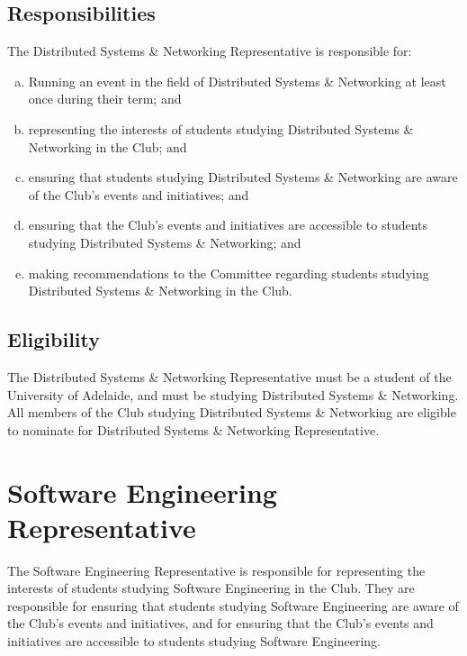 \documentclass[11pt]{report}
\begin{document}
\subsection{Responsibilities}
The Distributed Systems \& Networking Representative is responsible for:
\begin{enumerate}[(a)]
    \item Running an event in the field of Distributed Systems \& Networking at least once during their term; and
    \item representing the interests of students studying Distributed Systems \& Networking in the Club; and
    \item ensuring that students studying Distributed Systems \& Networking are aware of the Club's events and initiatives; and
    \item ensuring that the Club's events and initiatives are accessible to students studying Distributed Systems \& Networking; and
    \item making recommendations to the Committee regarding students studying Distributed Systems \& Networking in the Club.
\end{enumerate}
\subsection{Eligibility}
The Distributed Systems \& Networking Representative must be a student of the University of Adelaide, and must be studying Distributed Systems \& Networking. All members of the Club studying Distributed Systems \& Networking are eligible to nominate for Distributed Systems \& Networking Representative.

\section{Software Engineering Representative}
The Software Engineering Representative is responsible for representing the interests of students studying Software Engineering in the Club. They are responsible for ensuring that students studying Software Engineering are aware of the Club's events and initiatives, and for ensuring that the Club's events and initiatives are accessible to students studying Software Engineering.
\end{document}
